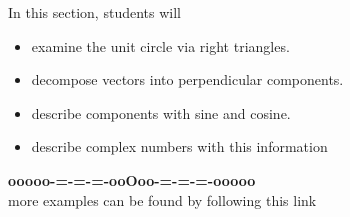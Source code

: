 \documentclass{ximera}
\begin{document}
\begin{sectionOutcomes}
In this section, students will 

\begin{itemize}
\item examine the unit circle via right triangles.
\item decompose vectors into perpendicular components.
\item describe components with sine and cosine.
\item describe complex numbers with this information
\end{itemize}
\end{sectionOutcomes}










\begin{center}
\textbf{\textcolor{green!50!black}{ooooo-=-=-=-ooOoo-=-=-=-ooooo}} \\

more examples can be found by following this link\\ 

\end{center}
\end{document}
